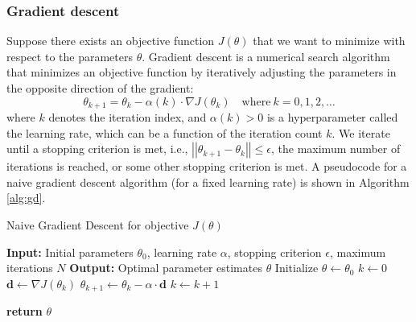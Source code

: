 \documentclass{article}[11pt]
\newcommand{\norm}[1]{\left|\left|#1\right|\right|}
\begin{document}
\subsubsection*{Gradient descent}
Suppose there exists an objective function $J(\theta)$ that we want to minimize with respect to the parameters $\theta$. 
Gradient descent is a numerical search algorithm that minimizes an objective function by iteratively adjusting the parameters in the opposite direction of the gradient:
\begin{equation*}
    \theta_{k+1} = \theta_{k} - \alpha(k)\cdot\nabla{J}(\theta_{k})\quad\text{where}{~k = 0,1,2,\dots}
\end{equation*}
where $k$ denotes the iteration index, and $\alpha(k)>0$ is a hyperparameter called the learning rate, which can be a function of the iteration count $k$.
We iterate until a stopping criterion is met, i.e., $\norm{\theta_{k+1} - \theta_{k}}\leq\epsilon$, the maximum number of iterations is reached, or some other stopping criterion is met.
A pseudocode for a naive gradient descent algorithm (for a fixed learning rate) is shown in Algorithm \ref{alg:gd}.
\begin{algorithm}[H]
\caption{Naive Gradient Descent for objective ${J}(\theta)$}\label{alg:gd}
\begin{algorithmic}[1]
\State \textbf{Input:} Initial parameters $\theta_0$, learning rate $\alpha$, stopping criterion $\epsilon$, maximum iterations $N$
\State \textbf{Output:} Optimal parameter estimates $\theta$
\State Initialize $\theta \gets \theta_0$
\State $k \gets 0$
    \State $\mathbf{d} \gets \nabla J(\theta_{k})$
    \State $\theta_{k+1} \gets \theta_{k} - \alpha \cdot \mathbf{d}$
    \State $k \gets k + 1$
\EndWhile

\State \textbf{return} $\theta$
\end{algorithmic}
\end{algorithm}
\end{document}
